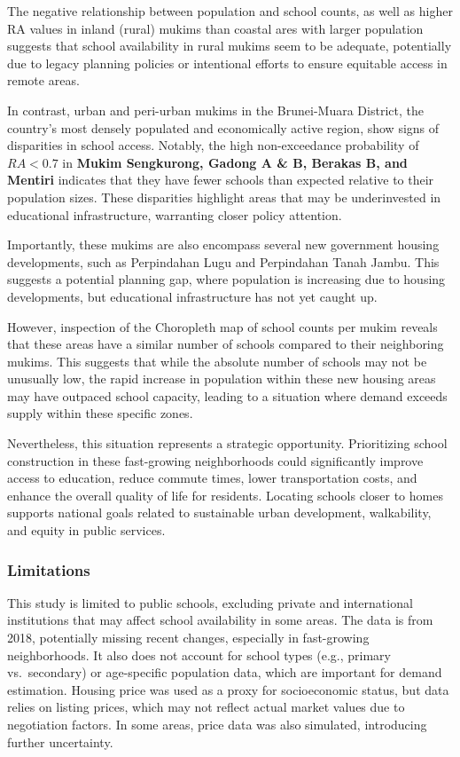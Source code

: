 \documentclass[
  12pt,
]{article}
\begin{document}
The negative relationship between population and school counts, as well
as higher RA values in inland (rural) mukims than coastal ares with
larger population suggests that school availability in rural mukims seem
to be adequate, potentially due to legacy planning policies or
intentional efforts to ensure equitable access in remote areas.

In contrast, urban and peri-urban mukims in the Brunei-Muara District,
the country's most densely populated and economically active region,
show signs of disparities in school access. Notably, the high
non-exceedance probability of \(RA < 0.7\) in \textbf{Mukim Sengkurong,
Gadong A \& B, Berakas B, and Mentiri} indicates that they have fewer
schools than expected relative to their population sizes. These
disparities highlight areas that may be underinvested in educational
infrastructure, warranting closer policy attention.

Importantly, these mukims are also encompass several new government
housing developments, such as Perpindahan Lugu and Perpindahan Tanah
Jambu. This suggests a potential planning gap, where population is
increasing due to housing developments, but educational infrastructure
has not yet caught up.

However, inspection of the Choropleth map of school counts per mukim
reveals that these areas have a similar number of schools compared to
their neighboring mukims. This suggests that while the absolute number
of schools may not be unusually low, the rapid increase in population
within these new housing areas may have outpaced school capacity,
leading to a situation where demand exceeds supply within these specific
zones.

Nevertheless, this situation represents a strategic opportunity.
Prioritizing school construction in these fast-growing neighborhoods
could significantly improve access to education, reduce commute times,
lower transportation costs, and enhance the overall quality of life for
residents. Locating schools closer to homes supports national goals
related to sustainable urban development, walkability, and equity in
public services.

\subsubsection{Limitations}\label{limitations}

This study is limited to public schools, excluding private and
international institutions that may affect school availability in some
areas. The data is from 2018, potentially missing recent changes,
especially in fast-growing neighborhoods. It also does not account for
school types (e.g., primary vs.~secondary) or age-specific population
data, which are important for demand estimation. Housing price was used
as a proxy for socioeconomic status, but data relies on listing prices,
which may not reflect actual market values due to negotiation factors.
In some areas, price data was also simulated, introducing further
uncertainty.
\end{document}
